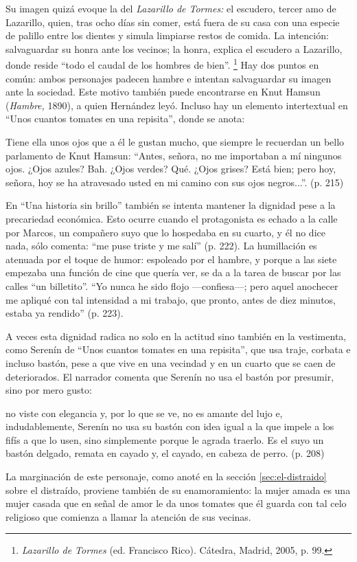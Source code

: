 \documentclass[14pt,twoside,final]{extbook} %
\let\oldfootnote\footnote
\renewcommand\footnote[1]{%
\oldfootnote{\hspace{1mm}#1}}
\begin{document}
Su imagen quizá evoque la del \emph{Lazarillo de Tormes:} el escudero, tercer amo de Lazarillo, quien, tras ocho días sin comer, está fuera de su casa con una especie de palillo entre los dientes y simula limpiarse restos de comida. La intención: salvaguardar su honra ante los vecinos; la honra, explica el escudero a Lazarillo, donde reside ``todo el caudal de los hombres de bien''.\footnote{\emph{Lazarillo de Tormes} (ed. Francisco Rico). Cátedra, Madrid, 2005, p. 99.} Hay dos puntos en común: ambos personajes padecen hambre e intentan salvaguardar su imagen ante la sociedad. Este motivo también puede encontrarse en Knut Hamsun (\emph{Hambre,} 1890), a quien Hernández leyó. Incluso hay un elemento intertextual en ``Unos cuantos tomates en una repisita'', donde se anota: 
\begin{quoting}
Tiene ella unos ojos que a él le gustan mucho, que siempre le recuerdan un bello parlamento de Knut Hamsun: ``Antes, señora, no me importaban a mí ningunos ojos. ¿Ojos azules? Bah. ¿Ojos verdes? Qué. ¿Ojos grises? Está bien; pero hoy, señora, hoy se ha atravesado usted en mi camino con sus ojos negros...''. (p. 215)
\end{quoting}
En ``Una historia sin brillo'' también se intenta mantener la dignidad pese a la precariedad económica. Esto ocurre cuando el protagonista es echado a la calle por Marcos, un compañero suyo que lo hospedaba en su cuarto, y él no dice nada, sólo comenta: ``me puse triste y me salí'' (p. 222). La humillación es atenuada por el toque de humor: espoleado por el hambre, y porque a las siete empezaba una función de cine que quería ver, se da a la tarea de buscar por las calles ``un billetito''. ``Yo nunca he sido flojo ---confiesa---; pero aquel anochecer me apliqué con tal intensidad a mi trabajo, que pronto, antes de diez minutos, estaba ya rendido'' (p. 223).

A veces esta dignidad radica no solo en la actitud sino también en la vestimenta, como Serenín de ``Unos cuantos tomates en una repisita'', que usa traje, corbata e incluso bastón, pese a que vive en una vecindad y en un cuarto que se caen de deteriorados. El narrador comenta que Serenín no usa el bastón por presumir, sino por mero gusto:
\begin{quoting}
no viste con elegancia y, por lo que se ve, no es amante del lujo e, indudablemente, Serenín no usa su bastón con idea igual a la que impele a los fifís a que lo usen, sino simplemente porque le agrada traerlo. Es el suyo un bastón delgado, remata en cayado y, el cayado, en cabeza de perro. (p. 208)
\end{quoting}
La marginación de este personaje, como anoté en la sección \ref{sec:el-distraido} sobre el distraído, proviene también de su enamoramiento: la mujer amada es una mujer casada que en señal de amor le da unos tomates que él guarda con tal celo religioso que comienza a llamar la atención de sus vecinas.
\end{document}
